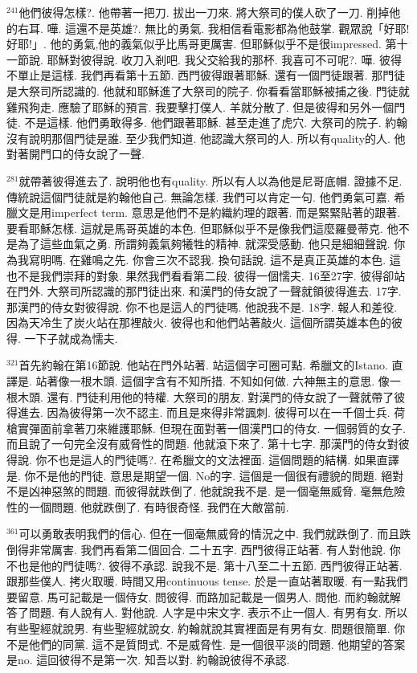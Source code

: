 \documentclass{book}
\begin{document}
$^{241}$他們彼得怎樣?.
他帶著一把刀.
拔出一刀來.
將大祭司的僕人砍了一刀.
削掉他的右耳.
嘩.
這還不是英雄?.
無比的勇氣.
我相信看電影都為他鼓掌.
觀眾說「好耶!好耶!」.
他的勇氣,他的義氣似乎比馬哥更厲害.
但耶穌似乎不是很impressed.
第十一節說.
耶穌對彼得說.
收刀入剎吧.
我父交給我的那杯.
我喜可不可呢?.
嘩.
彼得不單止是這樣.
我們再看第十五節.
西門彼得跟著耶穌.
還有一個門徒跟著.
那門徒是大祭司所認識的.
他就和耶穌進了大祭司的院子.
你看看當耶穌被捕之後.
門徒就雞飛狗走.
應驗了耶穌的預言.
我要擊打僕人.
羊就分散了.
但是彼得和另外一個門徒.
不是這樣.
他們勇敢得多.
他們跟著耶穌.
甚至走進了虎穴.
大祭司的院子.
約翰沒有說明那個門徒是誰.
至少我們知道.
他認識大祭司的人.
所以有quality的人.
他對著開門口的侍女說了一聲.

$^{281}$就帶著彼得進去了.
說明他也有quality.
所以有人以為他是尼哥底帽.
證據不足.
傳統說這個門徒就是約翰他自己.
無論怎樣.
我們可以肯定一句.
他們勇氣可嘉.
希臘文是用imperfect term.
意思是他們不是約織約理的跟著.
而是緊緊貼著的跟著.
要看耶穌怎樣.
這就是馬哥英雄的本色.
但耶穌似乎不是像我們這麼羅曼蒂克.
他不是為了這些血氣之勇.
所謂夠義氣夠犧牲的精神.
就深受感動.
他只是細細聲說.
你為我寫明嗎.
在雞鳴之先.
你會三次不認我.
換句話說.
這不是真正英雄的本色.
這也不是我們崇拜的對象.
果然我們看看第二段.
彼得一個懦夫.
16至27字.
彼得卻站在門外.
大祭司所認識的那門徒出來.
和漢門的侍女說了一聲就領彼得進去.
17字.
那漢門的侍女對彼得說.
你不也是這人的門徒嗎.
他說我不是.
18字.
報人和差役.
因為天冷生了炭火站在那裡敲火.
彼得也和他們站著敲火.
這個所謂英雄本色的彼得.
一下子就成為懦夫.

$^{321}$首先約翰在第16節說.
他站在門外站著.
站這個字可圈可點.
希臘文的Istano.
直譯是.
站著像一根木頭.
這個字含有不知所措.
不知如何做.
六神無主的意思.
像一根木頭.
還有.
門徒利用他的特權.
大祭司的朋友.
對漢門的侍女說了一聲就帶了彼得進去.
因為彼得第一次不認主.
而且是來得非常諷刺.
彼得可以在一千個士兵.
荷槍實彈面前拿著刀來維護耶穌.
但現在面對著一個漢門口的侍女.
一個弱質的女子.
而且說了一句完全沒有威脅性的問題.
他就滾下來了.
第十七字.
那漢門的侍女對彼得說.
你不也是這人的門徒嗎?.
在希臘文的文法裡面.
這個問題的結構.
如果直譯是.
你不是他的門徒.
意思是期望一個.
No的字.
這個是一個很有禮貌的問題.
絕對不是凶神惡煞的問題.
而彼得就跌倒了.
他就說我不是.
是一個毫無威脅.
毫無危險性的一個問題.
他就跌倒了.
有時很奇怪.
我們在大敵當前.

$^{361}$可以勇敢表明我們的信心.
但在一個毫無威脅的情況之中.
我們就跌倒了.
而且跌倒得非常厲害.
我們再看第二個回合.
二十五字.
西門彼得正站著.
有人對他說.
你不也是他的門徒嗎?.
彼得不承認.
說我不是.
第十八至二十五節.
西門彼得正站著.
跟那些僕人.
拷火取暖.
時間又用continuous tense.
於是一直站著取暖.
有一點我們要留意.
馬可記載是一個侍女.
問彼得.
而路加記載是一個男人.
問他.
而約翰就解答了問題.
有人說有人.
對他說.
人字是中宋文字.
表示不止一個人.
有男有女.
所以有些聖經就說男.
有些聖經就說女.
約翰就說其實裡面是有男有女.
問題很簡單.
你不是他們的同黨.
這不是質問式.
不是威脅性.
是一個很平淡的問題.
他期望的答案是no.
這回彼得不是第一次.
知吾以對.
約翰說彼得不承認.
\end{document}
